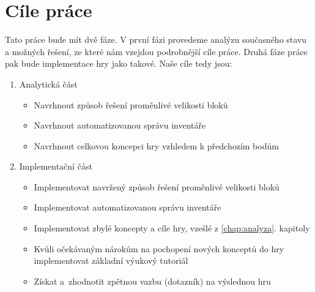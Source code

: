 \section{Cíle práce}
Tato práce bude mít dvě fáze. V první fázi provedeme analýzu současného stavu a možných řešení, ze které nám vzejdou podrobnější cíle práce. Druhá fáze práce pak bude implementace hry jako takové. Naše cíle tedy jsou:

\begin{enumerate}

 \item Analytická část
\begin{itemize}
	\item Navrhnout způsob řešení proměnlivé velikosti bloků
	\item Navrhnout automatizovanou správu inventáře
	\item Navrhnout celkovou koncepci hry vzhledem k předchozím bodům
\end{itemize}

 \item Implementační část
\begin{itemize}
	\item Implementovat navržený způsob řešení proměnlivé velikosti bloků
	\item Implementovat automatizovanou správu inventáře
	\item Implementovat zbylé koncepty a cíle hry, vzešlé z \ref{chap:analyza}. kapitoly
	\item Kvůli očekávaným nárokům na pochopení nových konceptů do hry implementovat základní výukový tutoriál
	\item Získat a~zhodnotit zpětnou vazbu (dotazník) na výslednou hru
\end{itemize}

\end{enumerate}


